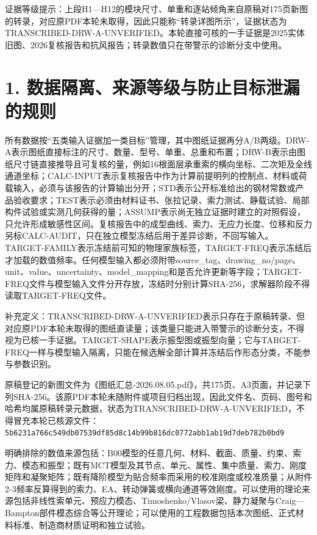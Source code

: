 \documentclass[UTF8,a4paper,11pt,fontset=none]{ctexart}
\begin{document}
证据等级提示：上段H1—H12的模块尺寸、单重和逐站倾角来自原稿对175页新图的转录，对应原PDF本轮未取得，因此只能称“转录详图所示”，证据状态为TRANSCRIBED-DRW-A-UNVERIFIED。本轮直接可核的一手证据是2025实体旧图、2026复核报告和抗风报告；转录数值只在带警示的诊断分支中使用。\par
{}
\section*{1. 数据隔离、来源等级与防止目标泄漏的规则}
所有数据按“五类输入证据加一类目标”管理，其中图纸证据再分A/B两级。DRW-A表示图纸直接标注的尺寸、数量、型号、单重、总重和布置；DRW-B表示由图纸尺寸链直接推导且可复核的量，例如16根面层承重索的横向坐标、二次矩及全线通道坐标；CALC-INPUT表示复核报告中作为计算前提明列的控制点、材料或荷载输入，必须与该报告的计算输出分开；STD表示公开标准给出的钢材常数或产品验收要求；TEST表示必须由材料证书、张拉记录、索力测试、静载试验、局部构件试验或实测几何获得的量；ASSUMP表示尚无独立证据时建立的对照假设，只允许形成敏感性区间。复核报告中的成型曲线、索力、无应力长度、位移和反力另标CALC-AUDIT，只在独立模型冻结后用于差异诊断，不回写输入。TARGET-FAMILY表示冻结前可知的物理家族标签，TARGET-FREQ表示冻结后才加载的数值频率。任何模型输入都必须附带source\_tag、drawing\_no/page、unit、value、uncertainty、model\_mapping和是否允许更新等字段；TARGET-FREQ文件与模型输入文件分开存放，冻结时分别计算SHA-256，求解器阶段不得读取TARGET-FREQ文件。\par
补充定义：TRANSCRIBED-DRW-A-UNVERIFIED表示只存在于原稿转录、但对应原PDF本轮未取得的图纸直读量；该类量只能进入带警示的诊断分支，不得视为已核一手证据。TARGET-SHAPE表示振型图或振型向量；它与TARGET-FREQ一样与模型输入隔离，只能在候选解全部计算并冻结后作形态分类，不能参与参数识别。\par
原稿登记的新图文件为《图纸汇总-2026.08.05.pdf》，共175页、A3页面，并记录下列SHA-256。该原PDF本轮未随附件或项目归档出现，因此文件名、页码、图号和哈希均属原稿转录元数据，状态为TRANSCRIBED-DRW-A-UNVERIFIED，不得冒充本轮已核源文件： \nolinkurl{5b6231a766c549db07539df85d8c14b99b816dc0772abb1ab19d7deb782b0bd9}\par
明确排除的数值来源包括：B00模型的任意几何、材料、截面、质量、约束、索力、模态和振型；既有MCT模型及其节点、单元、属性、集中质量、索力、刚度矩阵和凝聚矩阵；既有降阶模型为贴合频率而采用的校准刚度或校准质量；从附件2-3频率反算得到的索力、EA、转动弹簧或横向通道等效刚度。可以使用的理论来源包括非线性索单元、预应力模态、Timoshenko/Vlasov梁、静力凝聚与Craig—Bampton部件模态综合等公开理论；可以使用的工程数据包括本次图纸、正式材料标准、制造商材质证明和独立试验。\par
{}
\end{document}
